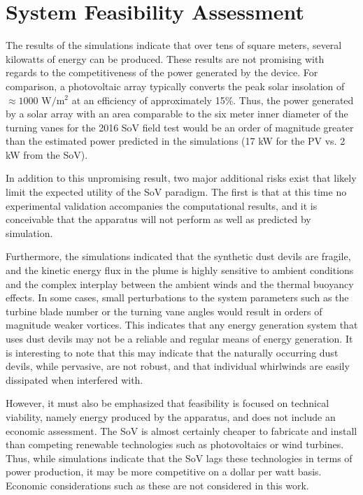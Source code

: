 %
%
\section{System Feasibility Assessment}

The results of the simulations indicate that over tens of square meters,
several kilowatts of energy can be produced. These results are not
promising with regards to the competitiveness of the power generated by
the device. For comparison, a photovoltaic array typically converts 
the peak solar insolation of $\approx 1000 \text{ W}/\text{m}^2$ at an efficiency 
of approximately 15\%. Thus, the power generated by a solar array with 
an area comparable to the six meter inner diameter of the turning 
vanes for the 2016 SoV field test would be an order of magnitude greater than 
the estimated power predicted in the simulations 
(17 kW for the PV vs. 2 kW from the SoV). 

In addition to this unpromising result, two major additional risks 
exist that likely limit the expected utility of the SoV paradigm. 
The first is that at this time no experimental validation accompanies the
computational results, and it is conceivable that the apparatus will not
perform as well as predicted by simulation.  

Furthermore, the simulations indicated that the synthetic dust devils 
are fragile, and
the kinetic energy flux in the plume is highly sensitive to ambient
conditions and the complex interplay between the ambient winds and the
thermal buoyancy effects. In some cases, small perturbations to the
system parameters such as the turbine blade number or the turning vane
angles would result in orders of magnitude weaker vortices. 
This indicates that any energy generation system that uses dust
devils may not be a reliable and regular means of energy generation. 
It is interesting to note that this may indicate that the 
naturally occurring dust devils, 
while pervasive, are not robust, and that individual whirlwinds are 
easily dissipated when interfered with. 

However, it must also be emphasized that feasibility is focused on
technical viability, namely energy produced by the apparatus, and does
not include an economic assessment. The SoV is almost certainly cheaper
to fabricate and install than competing renewable technologies such as
photovoltaics or wind turbines. Thus, while simulations indicate that
the SoV lags these technologies in terms of power production, it may be
more competitive on a dollar per watt basis. Economic considerations 
such as these are not considered in this work. 

